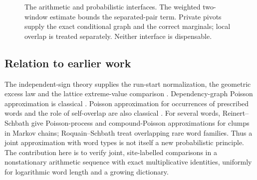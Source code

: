 \begin{figure}[t]
\centering
{}
\caption{The arithmetic and probabilistic interfaces. The weighted two-window
estimate bounds the separated-pair term. Private pivots supply the exact
conditional graph and the correct marginals; local overlap is treated
separately. Neither interface is dispensable.}\label{fig:proof-flow}
\end{figure}

\subsection{Relation to earlier work}
The independent-sign theory supplies the run-start normalization, the
geometric excess law and the lattice extreme-value comparison
\cite{Foldes1979,GordonSchillingWaterman1986,ArratiaGordonWaterman1990}.
Dependency-graph Poisson approximation is classical
\cite{ArratiaGoldsteinGordon1989,ArratiaGoldsteinGordon1990,ChenRollin2013}.
Poisson approximation for occurrences of prescribed words and the role of
self-overlap are also classical \cite{Godbole1991,GodboleSchaffner1993}.
For several words, Reinert--Schbath \cite{ReinertSchbath1998} give
Poisson-process and compound-Poisson approximations for clumps in Markov
chains; Roquain--Schbath \cite{RoquainSchbath2007} treat overlapping rare
word families. Thus a joint approximation with word types is not itself
a new probabilistic principle.
The contribution here is to verify joint, site-labelled comparisons in a
nonstationary arithmetic sequence with exact multiplicative identities,
uniformly for logarithmic word length and a growing dictionary.


